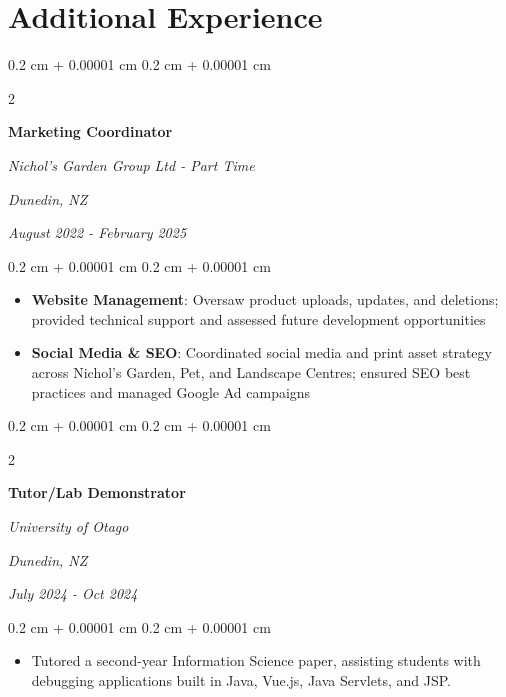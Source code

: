 \documentclass[10pt, letterpaper]{article}
\newenvironment{highlights}{
    \begin{itemize}[
        topsep=0.10 cm,
        parsep=0.10 cm,
        partopsep=0pt,
        itemsep=0pt,
        leftmargin=0.4 cm + 10pt
    ]
}{
    \end{itemize}
} %
\newenvironment{onecolentry}{
    \begin{adjustwidth}{
        0.2 cm + 0.00001 cm
    }{
        0.2 cm + 0.00001 cm
    }
}{
    \end{adjustwidth}
} %
\newenvironment{twocolentry}[2][]{
    \onecolentry
    \def\secondColumn{#2}
    \setcolumnwidth{\fill, 4.5 cm}
    \begin{paracol}{2}
}{
    \switchcolumn \raggedleft \secondColumn
    \end{paracol}
    \endonecolentry
} %
\begin{document}
 


    \newpage

    \section{Additional Experience}

    \begin{twocolentry}{
    \textit{Dunedin, NZ}   
        
    \textit{August 2022 - February 2025}
    \textit{}}
        \textbf{Marketing Coordinator}
        
        \textit{Nichol's Garden Group Ltd - Part Time}
    \end{twocolentry}
    \vspace{0.10 cm}
    \begin{onecolentry}
        \begin{highlights}
            \item \textbf{Website Management}: Oversaw product uploads, updates, and deletions; provided technical support and assessed future development opportunities
            \item \textbf{Social Media \& SEO}: Coordinated social media and print asset strategy across Nichol's Garden, Pet, and Landscape Centres; ensured SEO best practices and managed Google Ad campaigns
        \end{highlights}
    \end{onecolentry}

    \vspace{0.2 cm}

    \begin{twocolentry}{
    {\textit{Dunedin, NZ}}    
        
   \textit{July 2024 - Oct 2024 }}
        \textbf{Tutor/Lab Demonstrator}
        
        \textit{University of Otago}
    \end{twocolentry}
    \vspace{0.10 cm}
    \begin{onecolentry}
        \begin{highlights}
            \item Tutored a second-year Information Science paper, assisting students with debugging applications built in Java, Vue.js, Java Servlets, and JSP.
        \end{highlights}
    \end{onecolentry}
\end{document}
